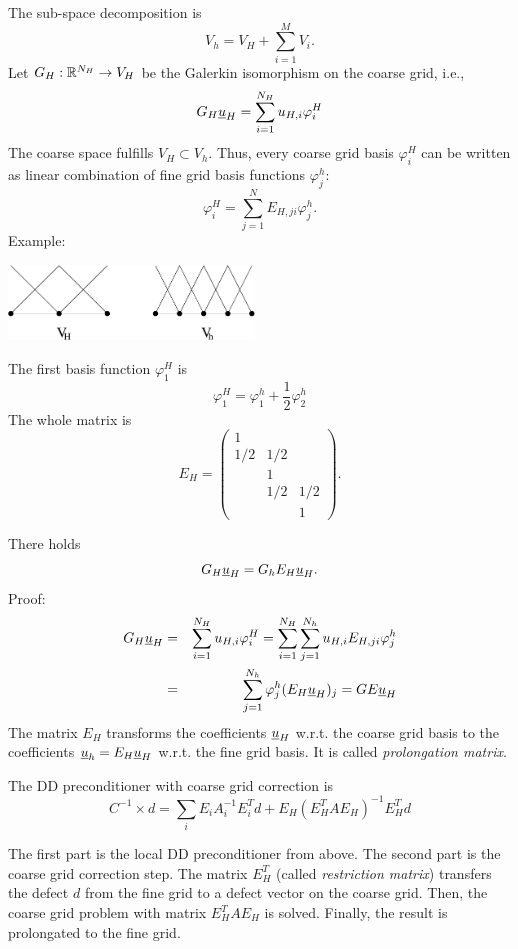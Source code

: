 The sub-space decomposition is
$$
V_h = V_H + \sum_{i=1}^M V_i.
$$
Let $G_H : {\mathbb R}^{N_H} \rightarrow V_H$ be the Galerkin isomorphism on the
coarse grid, i.e.,
$$
G_H \underline u_H = \sum_{i=1}^{N_H} u_{H,i} \varphi^H_i
$$
The coarse space fulfills $V_H \subset V_h$. Thus, every coarse grid
basis $\varphi^H_i$ can be written as linear combination of fine grid
basis functions $\varphi_j^h$:
$$
\varphi_i^H = \sum_{j=1}^N E_{H,ji} \varphi_j^h.
$$
Example:
\begin{center}
\includegraphics[height=2cm]{pictures/prol}
\end{center}
The first basis function $\varphi_1^H$ is
$$
\varphi_1^H = \varphi_1^h + \frac{1}{2} \varphi_2^h
$$
The whole matrix is
$$
E_H = 
\left( \begin{array}{ccc}
        1 \\
        1/2 & 1/2 \\
         & 1 & \\
        & 1/2 & 1/2 \\
        & & 1 
        \end{array} \right).
$$

There holds
$$
G_H \underline u_H = G_h E_H \underline u_H.
$$
Proof:
\begin{eqnarray*}
G_H \underline u_H & = & \sum_{i=1}^{N_H} u_{H,i} \varphi_i^H = \sum_{i=1}^{N_H} \sum_{j=1}^{N_h} u_{H,i} E_{H,ji} \varphi_j^h \\
        & = & \sum_{j=1}^{N_h} \varphi_j^h (E_H \underline u_H)_j = G E \underline u_H
\end{eqnarray*}
The matrix $E_H$ transforms the coefficients $\underline u_H$ w.r.t. the
coarse grid basis to the coefficients $\underline u_h = E_H \underline u_H$ w.r.t. the
fine grid basis. It is called {\em prolongation matrix}.

\medskip

The DD preconditioner with coarse grid correction is
$$
C^{-1} \times d = \sum_i E_i A_i^{-1} E_i^T d + E_H (E_H^T A E_H)^{-1} E_H^T d 
$$

The first part is the local DD preconditioner from above. The second part is
the coarse grid correction step. The matrix $E_H^T$ (called {\em restriction matrix}) transfers the defect $d$ from the fine grid to a defect vector on 
the coarse grid. Then, the coarse grid problem with matrix $E_H^T A E_H$
is solved. Finally, the result is prolongated to the fine grid. 

